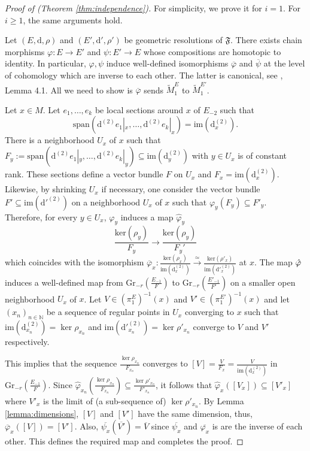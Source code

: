 \documentclass[10pt]{article}
\theoremstyle{plain}
\theoremstyle{definition}
\theoremstyle{remark}
\newcommand{\dd}{\mathrm{d}}
\begin{document}
\begin{proof}[Proof of (Theorem \ref{thm:independence})]
For simplicity, we prove it for $i=1$. For $i\geq 1$, the same arguments hold. 


Let $(E, \dd, \rho)$ and $(E', \dd', \rho')$ be geometric resolutions of $\mathfrak F$. There exists chain morphisms $\varphi \colon E\rightarrow E'$ and $\psi \colon E'\rightarrow E $ whose compositions are homotopic to identity. In particular, $\varphi, \psi$ induce well-defined isomorphisms $\overline{\varphi}$ and  $\overline{\psi}$ at the level of cohomology which are inverse to each other. The latter is canonical, see \cite{LLS}, Lemma 4.1. All we need to show is $\overline{\varphi}$ sends $\widetilde M_1^{E}$ to $\widetilde M_1^{E'}$. 


Let $x\in  M$. Let $e_1, \ldots, e_k$ %
be local sections around $x$ of $E_{-2}$ %
such that $$\mathrm{span}\left(\dd^{(2)}e_1|_x,\ldots, \dd^{(2)}e_k|_x \right)=\mathrm{im}(\dd^{(2)}_x).$$ There is a neighborhood  $U_x$ of $x$ such that $F_y:=\mathrm{span}\left(\dd^{(2)}e_1|_y,\ldots, \dd^{(2)}e_k|_y \right)\subseteq \mathrm{im}(\dd^{(2)}_y)$ with $y\in U_x$ is of constant rank. These sections define a vector bundle $F$ on $U_x$ and $F_x=\mathrm{im}(\dd^{(2)}_x)$. Likewise, by shrinking $U_x$ if necessary, one consider the vector bundle $ F'\subseteq \mathrm{im}({\dd'}^{(2)})$  on a neighborhood $U_x$ of $x$ such that $\varphi_y(F_y)\subseteq F'_y$. Therefore, for every $y\in U_x$,  $\varphi_y$ induces a map $\hat{\varphi}_y$  $$\frac{\mathrm{ker}(\rho_y)}{F_y}\longrightarrow \frac{\mathrm{ker}(\rho_y)}{F_y'}$$ which coincides with the isomorphism $\overline{\varphi}_x\colon \frac{\mathrm{ker}(\rho_x)}{\mathrm{im}(\dd^{(2)}_x)}\stackrel{\simeq}{\longrightarrow} \frac{\mathrm{ker}(\rho'_x)}{\mathrm{im}(\dd'^{(2)}_x)}$ at $x$. The map $\Hat{\varphi}$ induces a well-defined map from $\mathrm{Gr}_{-r}\left(\frac{E_{-1}}{F}\right)$ to $ \mathrm{Gr}_{-r}\left(\frac{E'_{-1}}{F'}\right)$ on a smaller open neighborhood $U_x$ of $x$.  Let $V\in(\pi_1^{E})^{-1}(x)$ and $V'\in(\pi_1^{E'})^{-1}(x)$ and let $(x_n)_{n\in \mathbb N}$ be a sequence of regular points in $U_x$ converging to $x$ such  that $\mathrm{im}(\dd^{(2)}_{x_n})=\ker\rho_{x_n}$ and $ \mathrm{im}(\dd'^{(2)}_{x_n})=\ker\rho'_{x_n}$ converge to $V$ and $V'$ respectively. 


 This implies that the sequence  $\frac{\ker\rho_{x_n}}{F_{x_n}}$ converges to $[V]=\frac{V}{F_x}=\frac{V}{\mathrm{im}(\dd^{(2)}_x)}$ in $\mathrm{Gr}_{-r}\left(\frac{E_{-1}}{F}\right)$.  Since $\hat{\varphi}_{x_n}\left(\frac{\ker\rho_{x_n}}{F_{x_n}}\right)\subseteq \frac{\ker\rho'_{x_n}}{F'_{x_n}}$, it follows that $\hat{\varphi}_x([V_x])\subseteq [V'_x]$ where $V'_x$ is the limit of (a sub-sequence of) $\ker\rho'_{x_n}$. By  Lemma \ref{lemma:dimensions},  $[V]$ and $[V']$ have the same dimension, thus, $\overline{\varphi}_x([V])= [V']$.   Also,  $\overline{\psi_x}(\overline{V'})=\overline{V}$ since $\overline{\psi_x}$ and $\overline{\varphi_x}$ is are the inverse of each other. This defines the required map and completes the proof. 



\end{proof}
\end{document}
